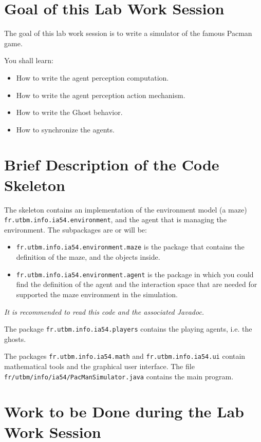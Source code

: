 \documentclass[article,english,nodocumentinfo]{multiagentfrreport}
\begin{document}
\section{Goal of this Lab Work Session}

The goal of this lab work session is to write a simulator of the famous Pacman game.

You shall learn: 
\begin{itemize}
\item How to write the agent perception computation.
\item How to write the agent perception action mechanism.
\item How to write the Ghost behavior.
\item How to synchronize the agents.
\end{itemize}



\section{Brief Description of the Code Skeleton}

The skeleton contains an implementation of the environment model (a maze) \texttt{fr.utbm.info.ia54.environment}, and the agent that is managing the environment.
The subpackages are or will be:
\begin{itemize}
\item \texttt{fr.utbm.info.ia54.environment.maze} is the package that contains the definition of the maze, and the objects inside.
\item \texttt{fr.utbm.info.ia54.environment.agent} is the package in which you could find the definition of the agent and the interaction space that are needed for supported the maze environment in the simulation.
\end{itemize}

\emph{It is recommended to read this code and the associated Javadoc.}

The package \texttt{fr.utbm.info.ia54.players} contains the playing agents, i.e. the ghosts.

The packages \texttt{fr.utbm.info.ia54.math} and \texttt{fr.utbm.info.ia54.ui} contain mathematical tools and the graphical user interface.
The file \texttt{fr/utbm/info/ia54/PacManSimulator.java} contains the main program.

\section{Work to be Done during the Lab Work Session}
\end{document}
